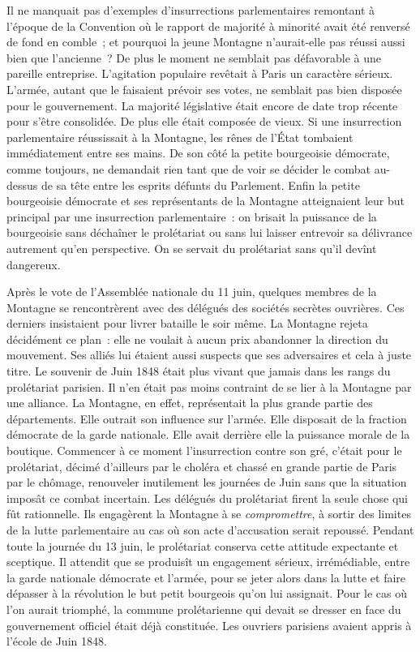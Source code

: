 \documentclass[french,twoside]{book} %
\begin{document}
Il ne manquait pas d’exemples d’insurrections parlementaires remontant à l’époque de la Convention où le rapport de majorité à minorité avait été renversé de fond en comble ; et pourquoi la jeune Montagne n’aurait-elle pas réussi aussi bien que l’ancienne ? De plus le moment ne semblait pas défavorable à une pareille entreprise. L’agitation populaire revêtait à Paris un caractère sérieux. L’armée, autant que le faisaient prévoir ses votes, ne semblait pas bien disposée pour le gouvernement. La majorité législative était encore de date trop récente pour s’être consolidée. De plus elle était composée de vieux. Si une insurrection parlementaire réussissait à la Montagne, les rênes de l’État tombaient immédiatement entre ses mains. De son côté la petite bourgeoisie démocrate, comme toujours, ne demandait rien tant que de voir se décider le combat au-dessus de sa tête entre les esprits défunts du Parlement. Enfin la petite bourgeoisie démocrate et ses représentants de la Montagne atteignaient leur but principal par une insurrection parlementaire : on brisait la puissance de la bourgeoisie sans déchaîner le prolétariat ou sans lui laisser entrevoir sa délivrance autrement qu’en perspective. On se servait du prolétariat sans qu’il devînt dangereux.\par
Après le vote de l’Assemblée nationale du 11 juin, quelques membres de la Montagne se rencontrèrent avec des délégués des sociétés secrètes ouvrières. Ces derniers insistaient pour livrer bataille le soir même. La Montagne rejeta décidément ce plan : elle ne voulait à aucun prix abandonner la direction du mouvement. Ses alliés lui étaient aussi suspects que ses adversaires et cela à juste titre. Le souvenir de Juin 1848 était plus vivant que jamais dans les rangs du prolétariat parisien. Il n’en était pas moins contraint de se lier à la Montagne par une alliance. La Montagne, en effet, représentait la plus grande partie des départements. Elle outrait son influence sur l’armée. Elle disposait de la fraction démocrate de la garde nationale. Elle avait derrière elle la puissance morale de la boutique. Commencer à ce moment l’insurrection contre son gré, c’était pour le prolétariat, décimé d’ailleurs par le choléra et chassé en grande partie de Paris par le chômage, renouveler inutilement les journées de Juin sans que la situation imposât ce combat incertain. Les délégués du prolétariat firent la seule chose qui fût rationnelle. Ils engagèrent la Montagne à se \emph{compromettre}, à sortir des limites de la lutte parlementaire au cas où son acte d’accusation serait repoussé. Pendant toute la journée du 13 juin, le prolétariat conserva cette attitude expectante et sceptique. Il attendit que se produisît un engagement sérieux, irrémédiable, entre la garde nationale démocrate et l’armée, pour se jeter alors dans la lutte et faire dépasser à la révolution le but petit bourgeois qu’on lui assignait. Pour le cas où l’on aurait triomphé, la commune prolétarienne qui devait se dresser en face du gouvernement officiel était déjà constituée. Les ouvriers parisiens avaient appris à l’école de Juin 1848.\par
\end{document}
